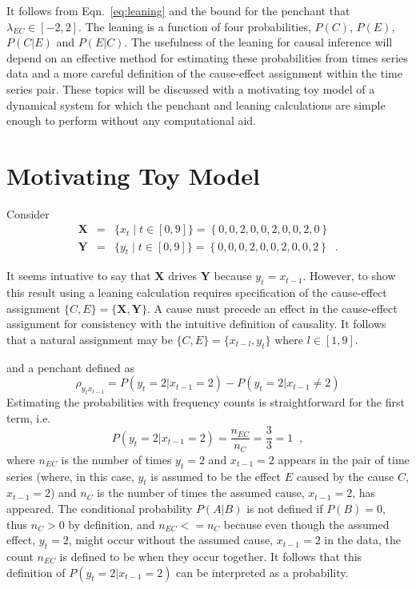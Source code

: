\documentclass[a4paper,11pt,twocolumn]{article}
\begin{document}
It follows from Eqn.\ \ref{eq:leaning} and the bound for the penchant that $\lambda_{EC}\in\left[-2,2\right]$.  The leaning is a function of four probabilities, $P(C)$, $P(E)$, $P(C|E)$ and $P(E|C)$.  The usefulness of the leaning for causal inference will depend on an effective method for estimating these probabilities from times series data and a more careful definition of the cause-effect assignment within the time series pair.  These topics will be discussed with a motivating toy model of a dynamical system for which the penchant and leaning calculations are simple enough to perform without any computational aid.

\section{Motivating Toy Model}
Consider
\begin{eqnarray*}
\mathbf{X} &=& \{x_t\; | \; t\in[0,9]\} = \left\{0,0,2,0,0,2,0,0,2,0\right\}\\
\mathbf{Y} &=& \{y_t\; | \; t\in[0,9]\} = \left\{0,0,0,2,0,0,2,0,0,2\right\}\;\;.
\end{eqnarray*}

It seems intuative to say that $\mathbf{X}$ drives $\mathbf{Y}$ because $y_t=x_{t-1}$.  However, to show this result using a leaning calculation requires specification of the cause-effect assignment $\{C,E\}=\{\mathbf{X},\mathbf{Y}\}$.  A cause must precede an effect in the cause-effect assignment for consistency with the intuitive definition of causality.  It follows that a natural assignment may be $\{C,E\}=\{x_{t-l},y_t\}$ where $l\in[1,9]$.


and a penchant defined as
$$
\rho_{y_{t}x_{t-1}} = P\left( y_t = 2 | x_{t-1} = 2\right) - P\left( y_t = 2 | x_{t-1} \neq 2\right)
$$
Estimating the probabilities with frequency counts is straightforward for the first term, i.e.\
$$
P\left( y_t = 2 | x_{t-1} = 2\right) = \frac{n_{EC}}{n_C} = \frac{3}{3} = 1\;\;,
$$
where $n_{EC}$ is the number of times $y_t=2$ and $x_{t-1}=2$ appears in the pair of time series (where, in this case, $y_t$ is assumed to be the effect $E$ caused by the cause $C$, $x_{t-1}=2$) and $n_{C}$ is the number of times the assumed cause, $x_{t-1}=2$, has appeared.  The conditional probability $P(A|B)$ is not defined if $P(B) = 0$, thus $n_C >0$ by definition, and $n_{EC}<=n_C$ because even though the assumed effect, $y_t=2$, might occur without the assumed cause, $x_{t-1}=2$ in the data, the count $n_{EC}$ is defined to be when they occur together.  It follows that this definition of $P\left( y_t = 2 | x_{t-1} = 2\right)$ can be interpreted as a probability.  
\end{document}
